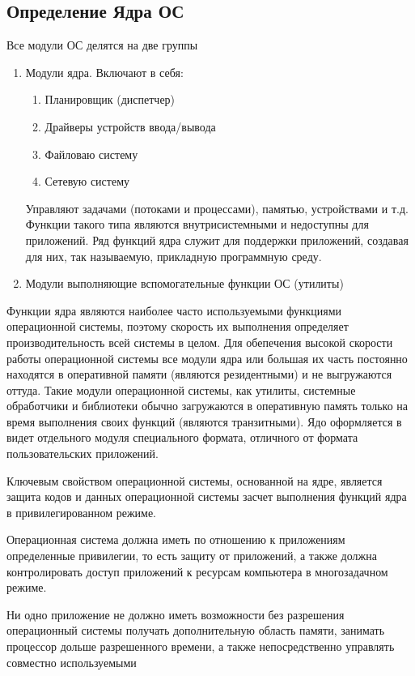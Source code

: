 \subsection{Определение Ядра ОС}
Все модули ОС делятся на две группы
\begin{enumerate}
	\item Модули ядра. Включают в себя:
		\begin{enumerate}
			\item Планировщик (диспетчер)
			\item Драйверы устройств ввода/вывода
			\item Файловаю систему
			\item Сетевую систему
		\end{enumerate}
		Управляют задачами (потоками и процессами), памятью, устройствами и т.д.
		Функции такого типа являются внутрисистемными и недоступны для приложений.
		Ряд функций ядра служит для поддержки приложений, создавая для них, так
		называемую, прикладную программную среду.
	\item Модули выполняющие вспомогательные функции ОС (утилиты)
\end{enumerate}\par
Функции ядра являются наиболее часто используемыми функциями операционной
системы, поэтому скорость их выполнения определяет производительность всей
системы в целом. Для обепечения высокой скорости работы операционной системы все
модули ядра или большая их часть постоянно находятся в оперативной памяти
(являются резидентными) и не выгружаются оттуда. Такие модули операционной
системы, как утилиты, системные обработчики и библиотеки обычно загружаются в
оперативную память только на время выполнения своих функций (являются
транзитными). Ядо оформляется в видет отдельного модуля специального формата,
отличного от формата пользовательских приложений.\par
Ключевым свойством операционной системы, основанной на ядре, является защита
кодов и данных операционной системы засчет выполнения функций ядра в
привилегированном режиме.\par
Операционная система должна иметь по отношению к приложениям определенные
привилегии, то есть защиту от приложений, а также должна контролировать доступ
приложений к ресурсам компьютера в многозадачном режиме.\par
Ни одно приложение не должно иметь возможности без разрешения операционный 
системы получать дополнительную область памяти, занимать процессор дольше
разрешенного времени, а также непосредственно управлять совместно используемыми
